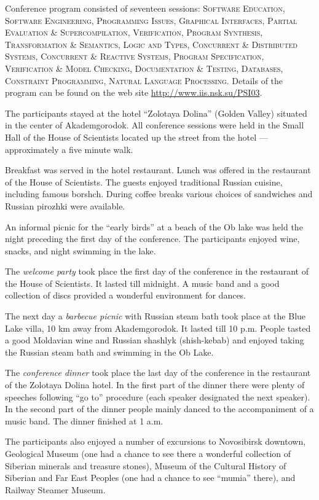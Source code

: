 \documentclass[final]{beatcs}
\begin{document}
 Conference program consisted of seventeen sessions: 
 {\scshape 
   Software Education, Software Engineering, Programming Issues,
   Graphical Interfaces, Partial Evaluation \&{} Supercompilation,
   Verification, Program Synthesis, Transformation \&{} Semantics,
   Logic and Types, Concurrent \&{} Distributed Systems, Concurrent \&{}
   Reactive Systems, Program Specification, Verification \&{} Model
   Checking, Documentation \&{} Testing, Databases, Constraint
   Programming, Natural Language Processing}. 
 Details of the program can be found on the web site
 \url{http://www.iis.nsk.su/PSI03}.

 The participants stayed at the hotel ``Zolotaya Dolina'' (Golden
 Valley) situated in the center of Akademgorodok. All conference
 sessions were held in the Small Hall of the House of Scientists
 located  up the street from the hotel --- approximately a five minute
 walk.  

 Breakfast was served in the hotel restaurant. Lunch was offered in
 the restaurant of the House of Scientists. The guests enjoyed
 traditional Russian cuisine, including famous borshch. During coffee
 breaks various choices of sandwiches and Russian pirozhki were
 available. 

 An informal picnic for the ``early birds'' at a beach of the Ob lake
 was held the night preceding the first day of the conference. The
 participants enjoyed wine, snacks, and night swimming in the lake.  

 The \textit{welcome party} took place the first day of the conference
 in the restaurant of the House of Scientists. It lasted till midnight. A
 music band and a good collection of discs provided a wonderful
 environment for dances. 

 The next day a \textit{barbecue picnic} with Russian steam bath took place
 at the Blue Lake villa, 10 km away from Akademgorodok. It lasted till 10
 p.m. People tasted a good Moldavian wine and Russian shashlyk
 (shish-kebab) and enjoyed taking the Russian steam bath and swimming
 in the Ob Lake.  

 The \textit{conference dinner} took place the last day of the conference in
 the restaurant of the Zolotaya Dolina hotel. In the first part of the
 dinner there were plenty of speeches following ``go to'' procedure
 (each speaker designated the next speaker). In the second part of the
 dinner people mainly danced to the accompaniment of a music band. The
 dinner finished at 1 a.m.  

 The participants also enjoyed a number of excursions to Novosibirsk
 downtown, Geological Museum (one had a chance to see there a
 wonderful collection of Siberian minerals and treasure stones),
 Museum of the Cultural History of Siberian and Far East Peoples (one
 had a chance to see ``mumia'' there), and Railway Steamer Museum. 
\end{document}
